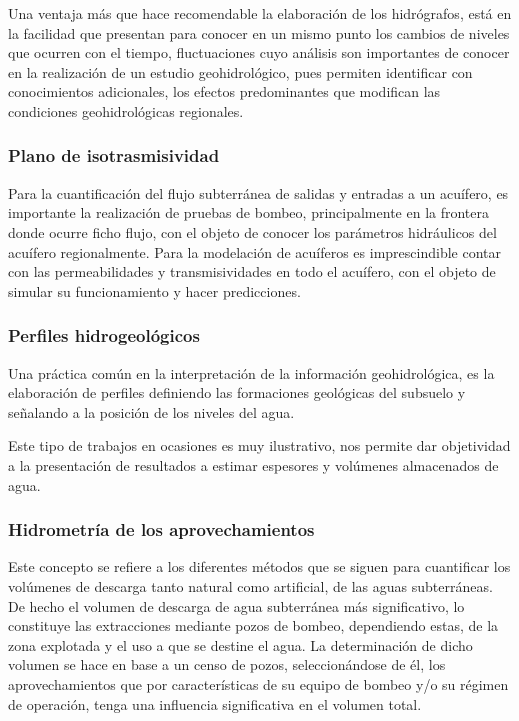 Una ventaja más que hace recomendable la elaboración de los hidrógrafos, está en la facilidad que presentan para conocer en un mismo punto los cambios de niveles que ocurren con el tiempo, fluctuaciones cuyo análisis son importantes de conocer en la realización de un estudio geohidrológico, pues permiten identificar con conocimientos adicionales, los efectos predominantes que modifican las condiciones geohidrológicas regionales.

\subsubsection{Plano de isotrasmisividad} 
Para la cuantificación del flujo subterránea de salidas y entradas a un acuífero, es importante la realización de pruebas de bombeo, principalmente en la frontera donde ocurre ficho flujo, con el objeto de conocer los parámetros hidráulicos del acuífero regionalmente. Para la modelación de acuíferos es imprescindible contar con las permeabilidades y transmisividades en todo el acuífero, con el objeto de simular su funcionamiento y hacer predicciones.

\subsubsection{Perfiles hidrogeológicos}
Una práctica común en la interpretación de la información geohidrológica, es la elaboración de perfiles definiendo las formaciones geológicas del subsuelo y señalando a la posición de los niveles del agua.

Este tipo de trabajos en ocasiones es muy ilustrativo, nos permite dar objetividad a la presentación de resultados a estimar espesores y volúmenes almacenados de agua.
\subsubsection{Hidrometría de los aprovechamientos}
Este concepto se refiere a los diferentes métodos que se siguen para cuantificar los volúmenes de descarga tanto natural como artificial, de las aguas subterráneas. De hecho el volumen de descarga de agua subterránea más significativo, lo constituye las extracciones mediante pozos de bombeo, dependiendo estas, de la zona explotada y el uso a que se destine el agua. La determinación de dicho volumen se hace en base a un censo de pozos, seleccionándose de él, los aprovechamientos que por características de su equipo de bombeo y/o su régimen de operación, tenga una influencia significativa en el volumen total.

